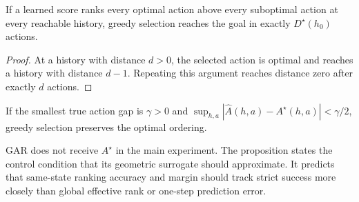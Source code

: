 \begin{proposition}
If a learned score ranks every optimal action above every suboptimal action at every reachable history, greedy selection reaches the goal in exactly $D^\star(h_0)$ actions.
\end{proposition}
\begin{proof}
At a history with distance $d>0$, the selected action is optimal and reaches a history with distance $d-1$. Repeating this argument reaches distance zero after exactly $d$ actions.
\end{proof}

\begin{corollary}
If the smallest true action gap is $\gamma>0$ and $\sup_{h,a}|\widehat A(h,a)-A^\star(h,a)|<\gamma/2$, greedy selection preserves the optimal ordering.
\end{corollary}

GAR does not receive $A^\star$ in the main experiment. The proposition states the control condition that its geometric surrogate should approximate. It predicts that same-state ranking accuracy and margin should track strict success more closely than global effective rank or one-step prediction error.
